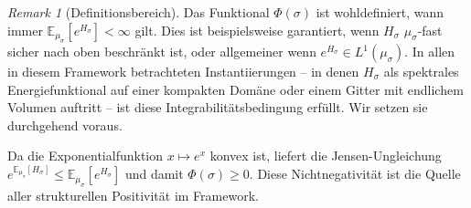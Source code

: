 \documentclass[12pt,a4paper]{article}
\theoremstyle{definition}
\theoremstyle{remark}
\newtheorem{remark}[theorem]{Remark}
\newcommand{\EE}{\mathbb{E}}
\begin{document}
\begin{remark}[Definitionsbereich]
\label{rem:rfep-domain}
Das Funktional $\Phi(\sigma)$ ist wohldefiniert, wann immer $\EE_{\mu_\sigma}[e^{H_\sigma}] < \infty$ gilt. Dies ist beispielsweise garantiert, wenn $H_\sigma$ $\mu_\sigma$-fast sicher nach oben beschränkt ist, oder allgemeiner wenn $e^{H_\sigma} \in L^1(\mu_\sigma)$. In allen in diesem Framework betrachteten Instantiierungen -- in denen $H_\sigma$ als spektrales Energiefunktional auf einer kompakten Domäne oder einem Gitter mit endlichem Volumen auftritt -- ist diese Integrabilitätsbedingung erfüllt. Wir setzen sie durchgehend voraus.
\end{remark}

\noindent
Da die Exponentialfunktion $x \mapsto e^x$ konvex ist, liefert die Jensen-Ungleichung $e^{\EE_{\mu_\sigma}[H_\sigma]} \le \EE_{\mu_\sigma}[e^{H_\sigma}]$ und damit $\Phi(\sigma) \ge 0$. Diese Nichtnegativität ist die Quelle aller strukturellen Positivität im Framework.
\end{document}
